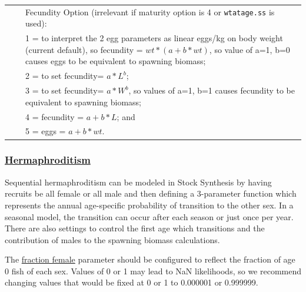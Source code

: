 \begin{longtable}{p{0.5cm} p{2cm} p{13cm}}
	\Tstrut 1 & & Fecundity Option (irrelevant if maturity option is 4 or \texttt{wtatage.ss} is used): \\
	  & & 1 = to interpret the 2 egg parameters as linear eggs/kg on body weight (current default), so fecundity = $wt*(a+b*wt)$, so value of a=1, b=0 causes eggs to be equivalent to spawning biomass; \\
	  & & 2 = to set fecundity= $a*L^b$; \\
	  & & 3 = to set fecundity= $a*W^b$, so values of a=1, b=1 causes fecundity to be equivalent to spawning biomass; \\
	  & & 4 = fecundity = $a+b*L$; and \\
	  & & 5 = eggs = $a+b*wt$. \Bstrut\\
	\hline
\end{longtable}

\hypertarget{Hermaphroditism}{}
\subsubsection[Hermaphroditism]{\protect\hyperlink{Hermaphroditism}{Hermaphroditism}}

Sequential hermaphroditism can be modeled in Stock Synthesis by having recruits be all female or all male and then defining a 3-parameter function which represents the annual age-specific probability of transition to the other sex. In a seasonal model, the transition can occur after each season or just once per year. There are also settings to control the first age which transitions and the contribution of males to the spawning biomass calculations.

The \hyperlink{SexRatio}{fraction female} parameter should be configured to reflect the fraction of age 0 fish of each sex. Values of 0 or 1 may lead to NaN likelihoods, so we recommend changing values that would be fixed at 0 or 1 to 0.000001 or 0.999999.

